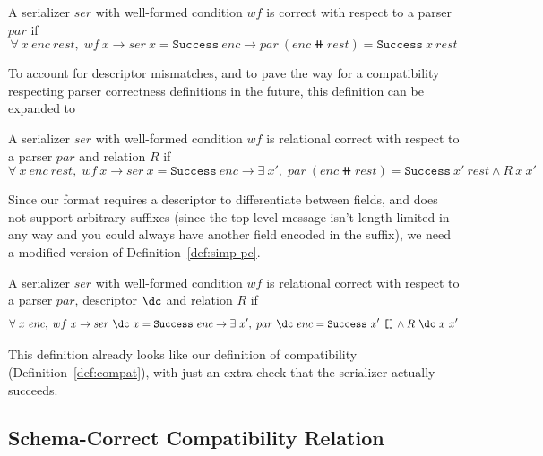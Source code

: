 \vspace{1em}
\begin{definition}\label{def:base-pc}
  A serializer $ser$ with well-formed condition $wf$ is correct with respect to
  a parser $par$ if
  \[\forall\ x\ enc\ rest,\;wf\ x \rightarrow ser\ x = \mathtt{Success}\ enc \rightarrow par\ (enc \doubleplus rest) =
    \mathtt{Success}\ x\ rest \]
\end{definition}

To account for descriptor mismatches, and to pave the way for a compatibility
respecting parser correctness definitions in the future, this definition can be
expanded to

\vspace{1em}
\begin{definition}\label{def:simp-pc}
  A serializer $ser$ with well-formed condition $wf$ is relational correct with
  respect to a parser $par$ and relation $R$ if
  \[ \forall\ x\ enc\ rest,\;wf\ x \to ser\ x = \mathtt{Success}\ enc \rightarrow \exists\ x',\;par\ (enc
    \doubleplus rest) = \mathtt{Success}\ x'\ rest \wedge R\ x\ x' \]
\end{definition}

Since our format requires a descriptor to differentiate between fields, and does
not support arbitrary suffixes (since the top level message isn't length limited
in any way and you could always have another field encoded in the suffix), we
need a modified version of Definition~\ref{def:simp-pc}.

\vspace{1em}
\begin{definition}
  A serializer $ser$ with well-formed condition $wf$ is relational correct with
  respect to a parser $par$, descriptor $\dc$ and relation $R$ if
  \[ \forall\ x\ enc,\;wf\ x \to ser\ \dc\ x = \mathtt{Success}\ enc \rightarrow \exists\ x',\;par\ \dc\ enc
    = \mathtt{Success}\ x'\ \nil \wedge R\ \dc\ x\ x' \]
\end{definition}\label{def:rpc}

This definition already looks like our definition of compatibility
(Definition~\ref{def:compat}), with just an extra check that the serializer
actually succeeds.

\subsection{Schema-Correct Compatibility Relation}\label{sec:sc-id-compat}

